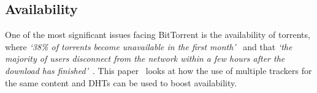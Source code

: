\subsection*{Availability}\label{subsec:availability}

One of the most significant issues facing BitTorrent is the availability of torrents, where \textit{`38\% of torrents become unavailable in the first month'}~\cite{kaune_unraveling_2010} and that \textit{`the majority of users disconnect from the network within a few hours after the download has finished'}~\cite{pouwelse_bittorrent_2005}.
This paper~\cite{neglia_availability_2007} looks at how the use of multiple trackers for the same content and DHTs can be used to boost availability.
